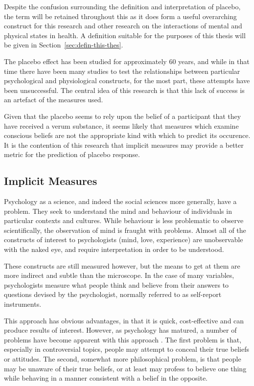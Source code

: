 Despite the confusion surrounding the definition and interpretation of placebo, the term will be retained throughout this  as it does form a useful overarching construct for this research and other research on the interactions of mental and physical states in health. A definition suitable for the purposes of this thesis will be given in Section~\ref{sec:defin-this-thes}.

The placebo effect has been studied for approximately 60 years, and while in that time there have been many studies to test the relationships between particular psychological and physiological constructs, for the most part, these attempts have been unsuccessful. The central idea of this research is that this lack of success is an artefact of the measures used. 

Given that the placebo seems to rely upon the belief of a participant that they have received a verum substance, it seems likely that measures which examine conscious beliefs are not the appropriate kind with which to predict its occurence. It is the contention of this research that implicit measures may provide a better metric for the prediction of placebo response. 

\subsection{Implicit Measures}
\label{sec:implicit-measures}

Psychology as a science, and indeed the social sciences more generally, have a problem. They seek to understand the mind and behaviour of individuals in particular contexts and cultures. While behaviour is less problematic to observe scientifically, the observation of mind is fraught with problems. Almost all of the constructs of interest to psychologists (mind, love, experience) are unobservable with the naked eye, and require interpretation in order to be understood. 

These constructs are still measured however, but the means to get at them are more indirect and subtle than the microscope. In the case of many variables, psychologists measure what people think and believe from their answers to questions devised by the psychologist, normally referred to as self-report instruments. 

This approach has obvious advantages, in that it is quick, cost-effective and can produce results of interest. However, as psychology has matured, a number of problems have become apparent with this approach \cite{Nisbett1977}.  The first problem is that, especially in controversial topics, people may attempt to conceal their true beliefs or attitudes. The second, somewhat more philosophical problem, is that people may be unaware of their true beliefs, or at least may profess to believe one thing while behaving in a manner consistent with a belief in the opposite. 

